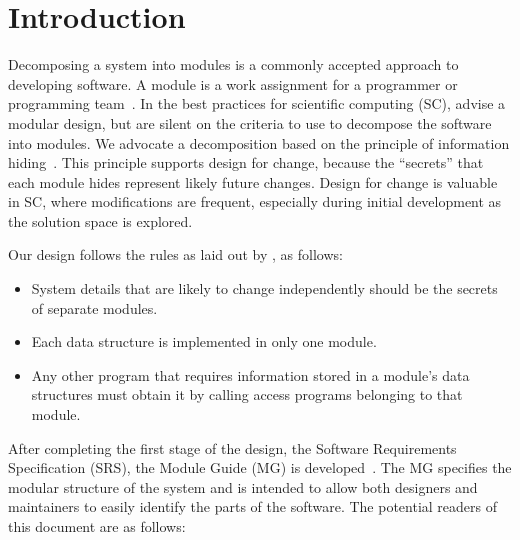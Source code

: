 \documentclass[12pt, titlepage]{article}
\begin{document}
\newpage

\tableofcontents

\listoftables

\listoffigures

\newpage


\section{Introduction}

Decomposing a system into modules is a commonly accepted approach to developing
software.  A module is a work assignment for a programmer or programming
team~\citep{ParnasEtAl1984}.  In the best practices for scientific computing (SC),
\citet{WilsonEtAl2013} advise a modular design, but are silent on the criteria
to use to decompose the software into modules.  We advocate a decomposition
based on the principle of information hiding~\citep{Parnas1972a}.  This
principle supports design for change, because the ``secrets'' that each module
hides represent likely future changes.  Design for change is valuable in SC,
where modifications are frequent, especially during initial development as the
solution space is explored.  

Our design follows the rules as laid out by \citet{ParnasEtAl1984}, as follows:
\begin{itemize}
\item System details that are likely to change independently should be the
  secrets of separate modules.
\item Each data structure is implemented in only one module.
\item Any other program that requires information stored in a module's data
  structures must obtain it by calling access programs belonging to that module.
\end{itemize}

After completing the first stage of the design, the Software Requirements
Specification (SRS), the Module Guide (MG) is developed~\citep{ParnasEtAl1984}. The MG
specifies the modular structure of the system and is intended to allow both
designers and maintainers to easily identify the parts of the software.  The
potential readers of this document are as follows:
\end{document}
